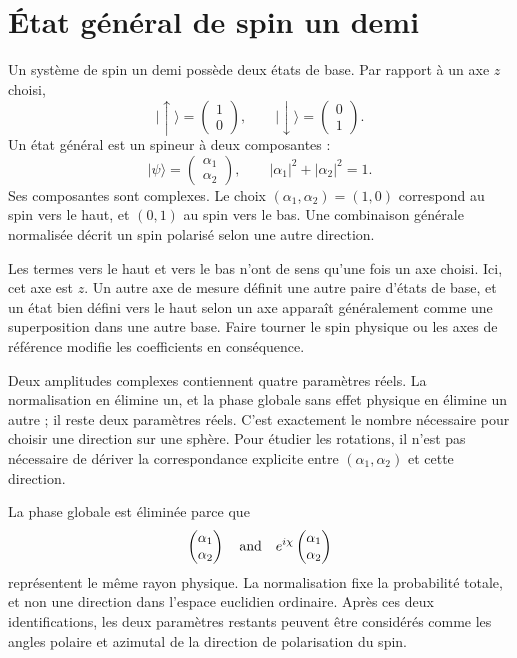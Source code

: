 \section{État général de spin un demi}

Un système de spin un demi possède deux états de base. Par rapport à un axe \(z\) choisi,
\begin{equation}
\lvert\uparrow\rangle=
\begin{pmatrix}1\\0\end{pmatrix},
\qquad
\lvert\downarrow\rangle=
\begin{pmatrix}0\\1\end{pmatrix}.
\end{equation}
Un état général est un spineur à deux composantes :
\begin{equation}
\lvert\psi\rangle=
\begin{pmatrix}\alpha_1\\\alpha_2\end{pmatrix},
\qquad
|\alpha_1|^2+|\alpha_2|^2=1.
\label{eq:l3-spinor}
\end{equation}
Ses composantes sont complexes. Le choix \((\alpha_1,\alpha_2)=(1,0)\) correspond au spin vers le haut, et \((0,1)\) au spin vers le bas. Une combinaison générale normalisée décrit un spin polarisé selon une autre direction.

Les termes {vers le haut} et {vers le bas} n’ont de sens qu’une fois un axe choisi. Ici, cet axe est \(z\). Un autre axe de mesure définit une autre paire d’états de base, et un état bien défini vers le haut selon un axe apparaît généralement comme une superposition dans une autre base. Faire tourner le spin physique ou les axes de référence modifie les coefficients en conséquence.

Deux amplitudes complexes contiennent quatre paramètres réels. La normalisation en élimine un, et la phase globale sans effet physique en élimine un autre ; il reste deux paramètres réels. C’est exactement le nombre nécessaire pour choisir une direction sur une sphère. Pour étudier les rotations, il n’est pas nécessaire de dériver la correspondance explicite entre \((\alpha_1,\alpha_2)\) et cette direction.

La phase globale est éliminée parce que
\begin{equation}
\begin{pmatrix}\alpha_1\\\alpha_2\end{pmatrix}
\quad\hbox{and}\quad
e^{i\chi}
\begin{pmatrix}\alpha_1\\\alpha_2\end{pmatrix}
\end{equation}
représentent le même rayon physique. La normalisation fixe la probabilité totale, et non une direction dans l’espace euclidien ordinaire. Après ces deux identifications, les deux paramètres restants peuvent être considérés comme les angles polaire et azimutal de la direction de polarisation du spin.

